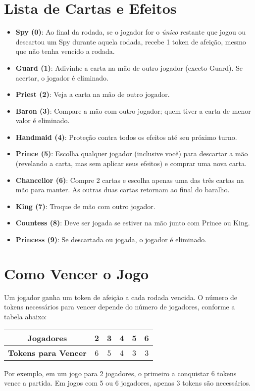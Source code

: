 \section{Lista de Cartas e Efeitos}
\begin{itemize}
    \item \textbf{Spy (0)}: Ao final da rodada, se o jogador for o \emph{único} restante que jogou ou descartou um Spy durante aquela rodada, recebe 1 token de afeição, mesmo que não tenha vencido a rodada.
    \item \textbf{Guard (1)}: Adivinhe a carta na mão de outro jogador (exceto Guard). Se acertar, o jogador é eliminado.
    \item \textbf{Priest (2)}: Veja a carta na mão de outro jogador.
    \item \textbf{Baron (3)}: Compare a mão com outro jogador; quem tiver a carta de menor valor é eliminado.
    \item \textbf{Handmaid (4)}: Proteção contra todos os efeitos até seu próximo turno.
    \item \textbf{Prince (5)}: Escolha qualquer jogador (inclusive você) para descartar a mão (revelando a carta, mas sem aplicar seus efeitos) e comprar uma nova carta.
    \item \textbf{Chancellor (6)}: Compre 2 cartas e escolha apenas uma das três cartas na mão para manter. As outras duas cartas retornam ao final do baralho.
    \item \textbf{King (7)}: Troque de mão com outro jogador.
    \item \textbf{Countess (8)}: Deve ser jogada se estiver na mão junto com Prince ou King.
    \item \textbf{Princess (9)}: Se descartada ou jogada, o jogador é eliminado.
\end{itemize}

\section{Como Vencer o Jogo}

Um jogador ganha um token de afeição a cada rodada vencida. O número de tokens necessários para vencer depende do número de jogadores, conforme a tabela abaixo:

\begin{center}
\begin{tabular}{|c|c|c|c|c|c|}
\hline
\textbf{Jogadores} & 2 & 3 & 4 & 5 & 6 \\
\hline
\textbf{Tokens para Vencer} & 6 & 5 & 4 & 3 & 3 \\
\hline
\end{tabular}
\end{center}

Por exemplo, em um jogo para 2 jogadores, o primeiro a conquistar 6 tokens vence a partida. Em jogos com 5 ou 6 jogadores, apenas 3 tokens são necessários.

